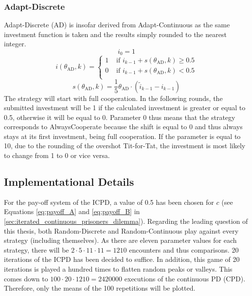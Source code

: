 \documentclass[11pt]{article}
\begin{document}
\subsubsection*{Adapt-Discrete}
Adapt-Discrete (AD) is insofar derived from Adapt-Continuous as the same investment function is taken and the results simply rounded to the nearest integer.
\begin{equation}
	i_0 = 1
	\label{eq:AD_i0}
\end{equation}
\begin{equation}
	i(\theta_{\mathrm{AD}}, k) =
	\begin{cases}
		1 & \text{ if } i_{k-1} + s(\theta_{\mathrm{AD}}, k) \ge 0.5\\
		0 & \text{ if } i_{k-1} + s(\theta_{\mathrm{AD}}, k) < 0.5\\
	\end{cases}
	\label{eq:AD_i_eq}
\end{equation}
\begin{equation}
	s(\theta_{\mathrm{AD}}, k) = \frac{1}{5} \theta_{\mathrm{AD}} \cdot (\tilde{i}_{k-1} - i_{k-1})
	\label{eq:AD_s_eq}
\end{equation}
The strategy will start with full cooperation.
In the following rounds, the submitted investment will be 1 if the calculated investment is greater or equal to 0.5, otherwise it will be equal to 0.
Parameter 0 thus means that the strategy corresponds to AlwaysCooperate because the shift is equal to 0 and thus always stays at its first investment, being full cooperation.
If the parameter is equal to 10, due to the rounding of the overshot Tit-for-Tat, the investment is most likely to change from 1 to 0 or vice versa.

\subsection{Implementational Details} \label{sec:implementational_details}

For the pay-off system of the ICPD, a value of 0.5 has been chosen for $c$ (see Equations \ref{eq:payoff_A} and \ref{eq:payoff_B} in \ref{sec:iterated_continuous_prisoners_dilemma}).
Regarding the leading question of this thesis, both Random-Discrete and Random-Continuous play against every strategy (including themselves).
As there are eleven parameter values for each strategy, there will be $2 \cdot 5 \cdot 11 \cdot 11 = 1210$ encounters and thus comparisons.
20 iterations of the ICPD has been decided to suffice.
In addition, this game of 20 iterations is played a hundred times to flatten random peaks or valleys.
This comes down to $100 \cdot 20 \cdot 1210 = 2420000$ executions of the continuous PD (CPD).
Therefore, only the means of the 100 repetitions will be plotted.
\end{document}
